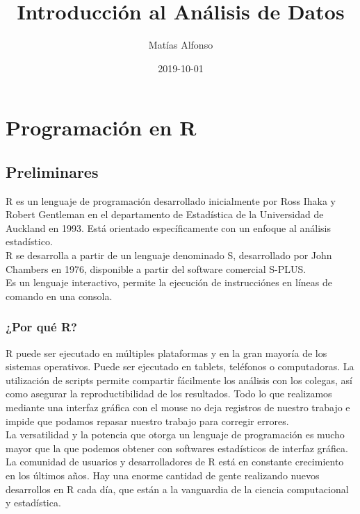 \documentclass[spanish,]{book}
\title{Introducción al Análisis de Datos}
\author{Matías Alfonso}
\date{2019-10-01}
\begin{document}
\maketitle

{
\setcounter{tocdepth}{1}
\tableofcontents
}
\part{Programación en R}\label{part-programacion-en-r}

\chapter{Preliminares}\label{prelim}

R es un lenguaje de programación desarrollado inicialmente por Ross
Ihaka y Robert Gentleman en el departamento de Estadística de la
Universidad de Auckland en 1993. Está orientado específicamente con un
enfoque al análisis estadístico.\\
R se desarrolla a partir de un lenguaje denominado S, desarrollado por
John Chambers en 1976, disponible a partir del software comercial
S-PLUS.\\
Es un lenguaje interactivo, permite la ejecución de instrucciónes en
líneas de comando en una consola.

\section{¿Por qué R?}\label{por-que-r}

R puede ser ejecutado en múltiples plataformas y en la gran mayoría de
los sistemas operativos. Puede ser ejecutado en tablets, teléfonos o
computadoras. La utilización de scripts permite compartir fácilmente los
análisis con los colegas, así como asegurar la reproductibilidad de los
resultados. Todo lo que realizamos mediante una interfaz gráfica con el
mouse no deja registros de nuestro trabajo e impide que podamos repasar
nuestro trabajo para corregir errores.\\
La versatilidad y la potencia que otorga un lenguaje de programación es
mucho mayor que la que podemos obtener con softwares estadísticos de
interfaz gráfica.\\
La comunidad de usuarios y desarrolladores de R está en constante
crecimiento en los últimos años. Hay una enorme cantidad de gente
realizando nuevos desarrollos en R cada día, que están a la vanguardia
de la ciencia computacional y estadística.
\end{document}
